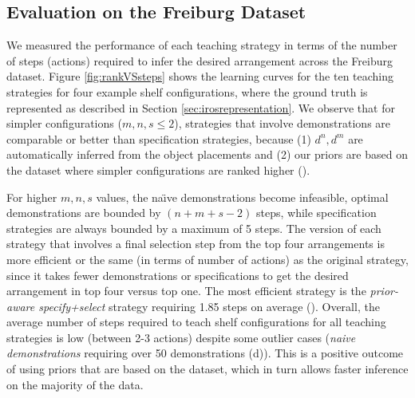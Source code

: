 


\subsection{Evaluation on the Freiburg Dataset}
We measured the performance of each teaching strategy in terms of the number of steps (\ie actions) required to infer the desired arrangement across the Freiburg dataset.
Figure \ref{fig:rankVSsteps} shows the learning curves for the ten teaching strategies for four example shelf configurations, where the ground truth is represented as described in Section \ref{sec:irosrepresentation}.
We observe that for simpler configurations ($m,n,s \leq 2$), strategies that involve demonstrations are comparable or better than specification strategies, because (1) $d^n, d^m$ are automatically inferred from the object placements and (2) our priors are based on the dataset where simpler configurations are ranked higher ().

For higher $m,n,s$ values, the na\"{\i}ve demonstrations become infeasible, optimal demonstrations are bounded by $(n+m+s-2)$ steps, while specification strategies are always bounded by a maximum of 5 steps. 
The version of each strategy that involves a final selection step from the top four arrangements is more efficient or the same (in terms of number of actions) as the original strategy, since it takes fewer demonstrations or specifications to get the desired arrangement in top four versus top one. 
The most efficient strategy is the \textit{prior-aware specify+select} strategy requiring 1.85 steps on average (). 
Overall, the average number of steps required to teach shelf configurations for all teaching strategies is low (between 2-3 actions) despite some outlier cases (\eg \textit{naive demonstrations} requiring over 50 demonstrations (d)).
This is a positive outcome of using priors that are based on the dataset, which in turn allows faster inference on the majority of the data.


